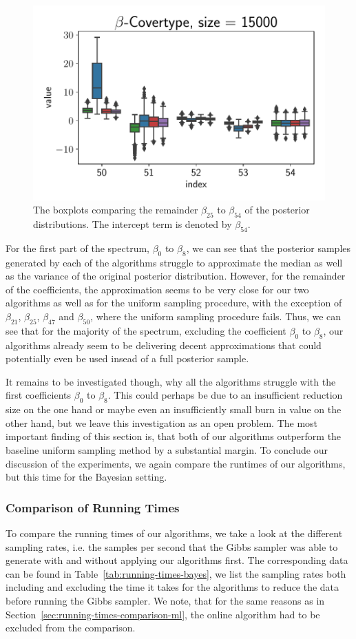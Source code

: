 \begin{figure}[ht!]
    \includegraphics[width=.49\linewidth]{figures/covertype_coefficients/covertype_coefficients_50.pdf}
    \caption{The boxplots comparing the remainder $\beta_{25}$
        to $\beta_{54}$ of the posterior distributions.
        The intercept term is denoted by $\beta_{54}$.}
    \label{fig:covertype-coefficients-2}
\end{figure}

For the first part of the spectrum, $\beta_0$ to $\beta_{8}$, we
can see that the posterior samples generated by
each of the algorithms struggle to approximate the median
as well as the variance of the original posterior distribution.
However, for the remainder of the coefficients, the approximation
seems to be very close for our two algorithms as well as for
the uniform sampling procedure, with the exception of
$\beta_{21}$, $\beta_{25}$, $\beta_{47}$ and $\beta_{50}$,
where the uniform sampling procedure fails.
Thus, we can see that for the majority of the spectrum, excluding
the coefficient $\beta_0$ to $\beta_{8}$, our algorithms already
seem to be delivering decent approximations that could potentially
even be used insead of a full posterior sample.

It remains to be investigated though, why all the algorithms struggle
with the first coefficients $\beta_0$ to $\beta_8$.
This could perhaps be due to an insufficient reduction size on
the one hand or maybe even an insufficiently small burn in value
on the other hand, but we leave this investigation as an open
problem. The most important finding of this section is, that both
of our algorithms outperform the baseline uniform sampling method
by a substantial margin.
To conclude our discussion of the experiments, we again compare
the runtimes of our algorithms, but this time for the
Bayesian setting.

\subsubsection{Comparison of Running Times}

To compare the running times of our algorithms, we take a
look at the different sampling rates, i.e.
the samples per second that the Gibbs sampler
was able to generate with and without applying our
algorithms first. The corresponding data can be found in
Table~\ref{tab:running-times-bayes}, we list the
sampling rates both including and excluding the
time it takes for the algorithms to reduce the data
before running the Gibbs sampler. We note, that for the
same reasons as in Section~\ref{sec:running-times-comparison-ml},
the online algorithm had to be excluded from the comparison.

